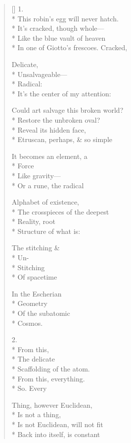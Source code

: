 \label{ch:the_second_law}
\settowidth{\versewidth}{In one of Giotto's frescoes.  Cracked,}
\begin{verse}[\versewidth]
1.\\*
This robin's egg will never hatch.\\*
It's cracked, though whole--- \\*
Like the blue vault of heaven\\*
In one of Giotto's frescoes.  Cracked,

Delicate,\\*
Unsalvageable---\\*
Radical:\\*
It's the center of my attention:

Could art salvage this broken world?\\*
Restore the unbroken oval?\\*
Reveal its hidden face,\\*
Etruscan, perhaps, \& so simple

It becomes an element, a\\*
Force\\*
Like gravity--- \\*
Or a rune, the radical

Alphabet of existence,\\*
The crosspieces of the deepest\\*
Reality, root\\*
Structure of what is:

The stitching \&\\*
Un-\\*
Stitching\\*
Of spacetime

In the Escherian \\*
Geometry\\*
Of the subatomic\\*
Cosmos.

2.\\*
 From this,\\*
The delicate\\*
Scaffolding of the atom.\\*
From this, everything.\\*
So. \qquad Every

Thing, however Euclidean,\\*
Is not a thing,\\*
Is not Euclidean, will not fit\\*
Back into itself, is constant


\end{verse}
